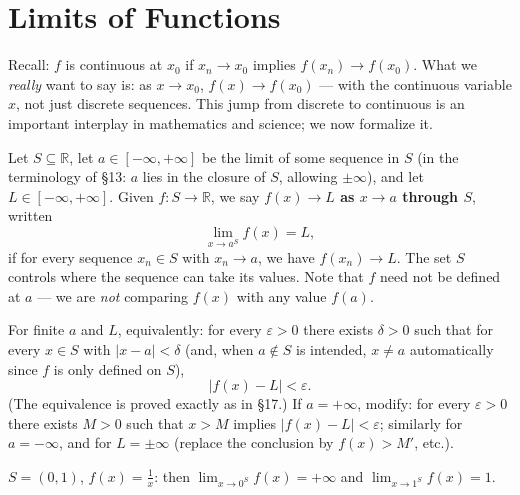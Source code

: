 \documentclass[11pt]{report}
\begin{document}

\section{Limits of Functions}

Recall: $f$ is continuous at $x_0$ if $x_n \to x_0$ implies $f(x_n) \to f(x_0)$. What we \emph{really} want to say is: as $x \to x_0$, $f(x) \to f(x_0)$ --- with the continuous variable $x$, not just discrete sequences. This jump from discrete to continuous is an important interplay in mathematics and science; we now formalize it.

\begin{defbox}
Let $S \subseteq \mathbb{R}$, let $a \in [-\infty, +\infty]$ be the limit of some sequence in $S$ (in the terminology of \S 13: $a$ lies in the closure of $S$, allowing $\pm\infty$), and let $L \in [-\infty, +\infty]$. Given $f: S \to \mathbb{R}$, we say \textbf{$f(x) \to L$ as $x \to a$ through $S$}, written
\[
\lim_{x \to a^S} f(x) = L,
\]
if for every sequence $x_n \in S$ with $x_n \to a$, we have $f(x_n) \to L$. The set $S$ controls where the sequence can take its values. Note that $f$ need not be defined at $a$ --- we are \emph{not} comparing $f(x)$ with any value $f(a)$.
\end{defbox}

\begin{rembox}
For finite $a$ and $L$, equivalently: for every $\varepsilon > 0$ there exists $\delta > 0$ such that for every $x \in S$ with $|x - a| < \delta$ (and, when $a \notin S$ is intended, $x \neq a$ automatically since $f$ is only defined on $S$),
\[
|f(x) - L| < \varepsilon.
\]
(The equivalence is proved exactly as in \S 17.) If $a = +\infty$, modify: for every $\varepsilon > 0$ there exists $M > 0$ such that $x > M$ implies $|f(x) - L| < \varepsilon$; similarly for $a = -\infty$, and for $L = \pm\infty$ (replace the conclusion by $f(x) > M'$, etc.).
\end{rembox}

\begin{exbox}
$S = (0,1)$, $f(x) = \tfrac1x$: then $\lim_{x\to 0^S} f(x) = +\infty$ and $\lim_{x \to 1^S} f(x) = 1$.
\end{exbox}
\end{document}
